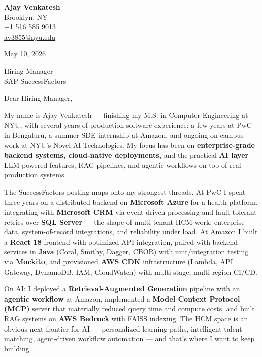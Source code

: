 \documentclass[letterpaper,11pt]{article}
\begin{document}
\begin{flushleft}
\textbf{\large Ajay Venkatesh} \\
Brooklyn, NY \\
+1 516 585 9013 \\
\href{mailto:av3855@nyu.edu}{av3855@nyu.edu}
\end{flushleft}

\vspace{10pt}

May 10, 2026

\vspace{6pt}

Hiring Manager \\
SAP SuccessFactors

\vspace{10pt}

Dear Hiring Manager,

My name is Ajay Venkatesh --- finishing my M.S. in Computer Engineering at NYU, with several years of production software experience: a few years at PwC in Bengaluru, a summer SDE internship at Amazon, and ongoing on-campus work at NYU's Novel AI Technologies. My focus has been on \textbf{enterprise-grade backend systems, cloud-native deployments,} and the practical \textbf{AI layer} --- LLM-powered features, RAG pipelines, and agentic workflows on top of real production systems.

The SuccessFactors posting maps onto my strongest threads. At PwC I spent three years on a distributed backend on \textbf{Microsoft Azure} for a health platform, integrating with \textbf{Microsoft CRM} via event-driven processing and fault-tolerant retries over \textbf{SQL Server} --- the shape of multi-tenant HCM work: enterprise data, system-of-record integrations, and reliability under load. At Amazon I built a \textbf{React 18} frontend with optimized API integration, paired with backend services in \textbf{Java} (Coral, Smithy, Dagger, CBOR) with unit/integration testing via \textbf{Mockito}, and provisioned \textbf{AWS CDK} infrastructure (Lambda, API Gateway, DynamoDB, IAM, CloudWatch) with multi-stage, multi-region CI/CD.

On AI: I deployed a \textbf{Retrieval-Augmented Generation} pipeline with an \textbf{agentic workflow} at Amazon, implemented a \textbf{Model Context Protocol (MCP)} server that materially reduced query time and compute costs, and built RAG systems on \textbf{AWS Bedrock} with FAISS indexing. The HCM space is an obvious next frontier for AI --- personalized learning paths, intelligent talent matching, agent-driven workflow automation --- and that's where I want to keep building.
\end{document}
